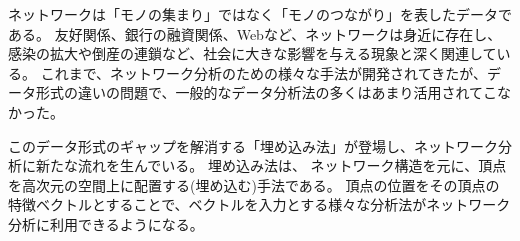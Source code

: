 \documentclass[12pt]{jarticle}
\begin{document}
ネットワークは「モノの集まり」ではなく「モノのつながり」を表したデータである。
友好関係、銀行の融資関係、Webなど、ネットワークは身近に存在し、感染の拡大や倒産の連鎖など、社会に大きな影響を与える現象と深く関連している。
これまで、ネットワーク分析のための様々な手法が開発されてきたが、データ形式の違いの問題で、一般的なデータ分析法の多くはあまり活用されてこなかった。%

%

%

このデータ形式のギャップを解消する「埋め込み法」が登場し、ネットワーク分析に新たな流れを生んでいる。
埋め込み法は、 ネットワーク構造を元に、頂点を高次元の空間上に配置する(埋め込む)手法である。
頂点の位置をその頂点の特徴ベクトルとすることで、ベクトルを入力とする様々な分析法がネットワーク分析に利用できるようになる。
\end{document}
